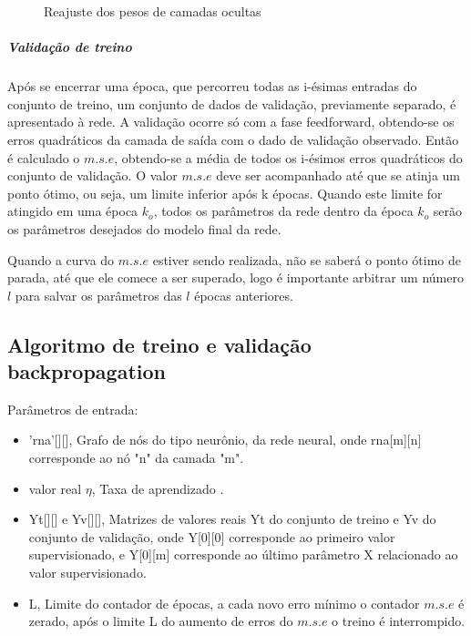 \documentclass[	12pt, Times, openright, twoside, a4paper, english, brazil]{abntex2}
\begin{document}
            \begin{figure}[!ht]
          	\caption{Reajuste dos pesos de camadas ocultas}
            \end{figure}
           
            \subparagraph{Validação de treino}
            Após se encerrar uma época, que percorreu todas as i-ésimas entradas do conjunto de treino, um conjunto de dados de validação, previamente separado, é apresentado à rede.
            A validação ocorre só com a fase feedforward, obtendo-se os erros quadráticos da camada de saída com o dado de validação observado.
            Então é calculado o $m.s.e$, obtendo-se a média de todos os i-ésimos erros quadráticos do conjunto de validação.
            O valor $m.s.e$ deve ser acompanhado até que se atinja um ponto ótimo, ou seja, um limite inferior após k épocas.
            Quando este limite for atingido em uma época $k_o$, todos os parâmetros da rede dentro da época $k_o$ serão os parâmetros desejados do modelo final da rede.
            
            Quando a curva do $m.s.e$ estiver sendo realizada, não se saberá o ponto ótimo de parada, até que ele comece a ser superado, logo é importante arbitrar um número $l$ para salvar os parâmetros das $l$ épocas anteriores.
        
        \subsection{Algoritmo de treino e validação backpropagation}
            Parâmetros de entrada:
            \begin{itemize}
                \item 'rna'[][], Grafo de nós do tipo neurônio, da rede neural, onde rna[m][n] corresponde ao nó "n" da camada "m".
                \item valor real $\eta$, Taxa de aprendizado .
                \item Yt[][] e Yv[][], Matrizes de valores reais Yt do conjunto de treino e Yv do conjunto de validação, onde Y[0][0] corresponde ao primeiro valor supervisionado, e Y[0][m] corresponde ao último parâmetro X relacionado ao valor supervisionado.
                \item L, Limite do contador de épocas, a cada novo erro mínimo o contador $m.s.e$ é zerado, após o limite L do aumento de erros do $m.s.e$ o treino é interrompido.                
            \end{itemize}
\end{document}
